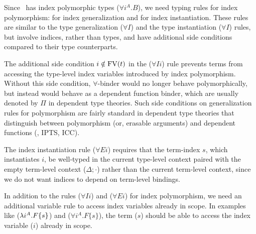 Since \Fi\ has index polymorphic types ($\forall i^A . B$),
we need typing rules for index polymorphism:
 for index generalization
and  for index instantiation.
These rules are similar to the type generalization ($\forall I$)
and the type instantiation ($\forall I$) rules, but involve
indices, rather than types, and have additional side conditions
compared to their type counterparts.

The additional side condition $i\notin\mathop{\mathrm{FV}}(t)$ in the ($\forall I i$) rule
prevents terms from accessing the type-level index variables introduced by
index polymorphism. Without this side condition, $\forall$-binder
would no longer behave polymorphically, but instead would behave as
a dependent function binder, which are usually denoted by $\Pi$ in
dependent type theories. Such side conditions on generalization rules
for polymorphism are fairly standard in dependent type theories that
distinguish between polymorphism (or, erasable arguments) and
dependent functions (\eg, IPTS\cite{LingerS08}, ICC\cite{Miquel01}).

The index instantiation rule ($\forall E i$) requires that
the term-index $s$, which instantiates $i$, be well-typed
in the current type-level context paired with the empty term-level context
($\Delta;\cdot$) rather than the current term-level context,
since we do not want indices to depend on term-level bindings.

In addition to the rules ($\forall I i$) and ($\forall E i$) for
index polymorphism, we need an additional variable rule 
to access index variables already in scope. In examples
like  ($\lambda i^A.F\{s\}$)  and ($\forall i^A.F\{s\}$), the term
($s$) should be able to access the index variable ($i$) already in scope.
